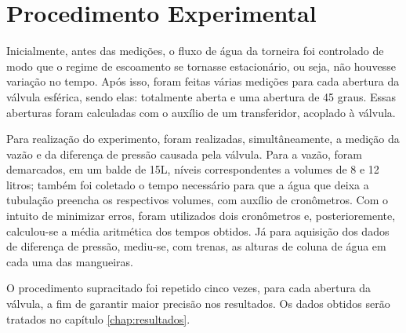 \chapter{Procedimento Experimental}
\label{chap:procedimento}



Inicialmente, antes das medições, o fluxo de água da torneira foi controlado de
modo que o regime de escoamento se tornasse estacionário, ou seja, não houvesse
variação no tempo. Após isso, foram feitas várias medições para cada abertura da
válvula esférica, sendo elas: totalmente aberta e uma abertura de 45 graus.
Essas aberturas foram calculadas com o auxílio de um transferidor, acoplado à
válvula. 

Para realização do experimento, foram realizadas, simultâneamente, a medição da
vazão e da diferença de pressão causada pela válvula. Para a vazão, foram
demarcados, em um balde de 15L, níveis correspondentes a volumes de 8 e 12 litros;
também foi coletado o tempo necessário para que a água que deixa a tubulação
preencha os respectivos volumes, com auxílio de cronômetros.  Com o intuito de
minimizar erros, foram utilizados dois cronômetros e, posterioremente,
calculou-se a média aritmética dos tempos obtidos. Já para aquisição dos dados
de diferença de pressão, mediu-se, com trenas, as alturas de coluna de água em
cada uma das mangueiras.

O procedimento supracitado foi repetido cinco vezes, para cada abertura da
válvula, a fim de garantir maior precisão nos resultados. Os dados obtidos
serão tratados no capítulo \ref{chap:resultados}.


